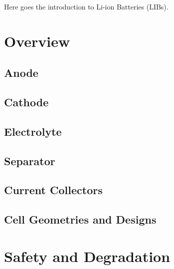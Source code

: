 Here goes the introduction to Li-ion Batteries (LIBs).

\section{Overview}
\label{sec:overview}

\subsection{Anode}
\label{sec:anode}

\subsection{Cathode}
\label{sec:cathode}

\subsection{Electrolyte}
\label{sec:electrolyte}

\subsection{Separator}
\label{sec:separator}

\subsection{Current Collectors}
\label{sec:current-collectors}

\subsection{Cell Geometries and Designs}
\label{sec:cell-geometries-designs}

\section{Safety and Degradation}
\label{sec:safety-degradation}
